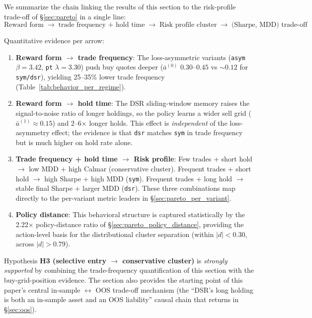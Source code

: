 \documentclass[11pt, a4paper]{article}
\begin{document}
We summarize the chain linking the results of this section to the
risk-profile trade-off of \S\ref{sec:pareto} in a single line:
\[
\boxed{
\text{Reward form}
\;\to\;
\text{trade frequency + hold time}
\;\to\;
\text{Risk profile cluster}
\;\to\;
\text{(Sharpe, MDD) trade-off}
}
\]

Quantitative evidence per arrow:

\begin{enumerate}[leftmargin=*]
\item \textbf{Reward form $\to$ trade frequency}: The loss-asymmetric variants
(\texttt{asym} $\beta=3.42$, \texttt{pt} $\lambda=3.30$) push buy quotes
deeper ($\bar{a}^{(0)}$ $0.30$--$0.45$ vs $\sim 0.12$ for \texttt{sym/dsr}),
yielding 25--35\% lower trade frequency (Table~\ref{tab:behavior_per_regime}).
\item \textbf{Reward form $\to$ hold time}: The DSR sliding-window memory
raises the signal-to-noise ratio of longer holdings, so the policy learns a
wider sell grid ($\bar{a}^{(1)} \approx 0.15$) and 2--6$\times$ longer holds.
This effect is \emph{independent} of the loss-asymmetry effect; the evidence
is that \texttt{dsr} matches \texttt{sym} in trade frequency but is much
higher on hold rate alone.
\item \textbf{Trade frequency + hold time $\to$ Risk profile}: Few trades +
short hold $\to$ low MDD + high Calmar (conservative cluster). Frequent
trades + short hold $\to$ high Sharpe + high MDD (\texttt{sym}). Frequent
trades + long hold $\to$ stable final Sharpe + larger MDD (\texttt{dsr}).
These three combinations map directly to the per-variant metric leaders in
\S\ref{sec:pareto_per_variant}.
\item \textbf{Policy distance}: This behavioral structure is captured
statistically by the 2.22$\times$ policy-distance ratio of
\S\ref{sec:pareto_policy_distance}, providing the action-level basis for the
distributional cluster separation (within $|d|<0.30$, across $|d|>0.79$).
\end{enumerate}

Hypothesis \textbf{H3 (selective entry $\to$ conservative cluster)} is
\emph{strongly supported} by combining the trade-frequency quantification of
this section with the buy-grid-position evidence. The section also provides
the starting point of this paper's central in-sample $\leftrightarrow$ OOS
trade-off mechanism (the ``DSR's long holding is both an in-sample asset and
an OOS liability'' causal chain that returns in \S\ref{sec:oos}).
\end{document}
